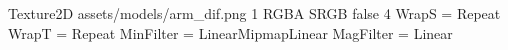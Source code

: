 Texture2D
assets/models/arm_dif.png
1
RGBA
SRGB
false
4
WrapS = Repeat
WrapT = Repeat
MinFilter = LinearMipmapLinear
MagFilter = Linear
